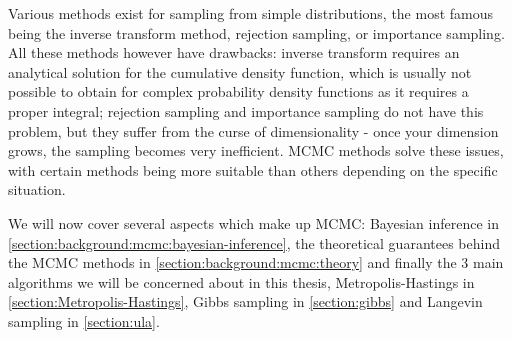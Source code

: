 \documentclass[12pt]{memoir}
\begin{document}
Various methods exist for sampling from simple distributions, the most famous being the inverse transform method, rejection sampling, or importance sampling. All these methods however have drawbacks: inverse transform requires an analytical solution for the cumulative density function, which is usually not possible to obtain for complex probability density functions as it requires a proper integral; rejection sampling and importance sampling do not have this problem, but they suffer from the curse of dimensionality - once your dimension grows, the sampling becomes very inefficient. MCMC methods solve these issues, with certain methods being more suitable than others depending on the specific situation.\medbreak

We will now cover several aspects which make up MCMC: Bayesian inference in \ref{section:background:mcmc:bayesian-inference}, the theoretical guarantees behind the MCMC methods in \ref{section:background:mcmc:theory} and finally the 3 main algorithms we will be concerned about in this thesis, Metropolis-Hastings in \ref{section:Metropolis-Hastings}, Gibbs sampling in \ref{section:gibbs} and Langevin sampling in \ref{section:ula}.
\end{document}

